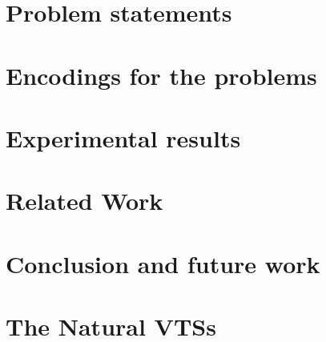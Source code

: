 \documentclass[]{llncs}
\begin{document}
\section{Problem statements}
\label{sec:problem}


\section{Encodings for the problems}
\label{sec:encoding}


\section{Experimental results}
\label{sec:experiments}


\section{Related Work}
\label{sec:related}


\section{Conclusion and future work}
\label{sec:conclusion}





\appendix
\clearpage

\section{The Natural VTSs}
\label{sec:ex-vts}

\end{document}
